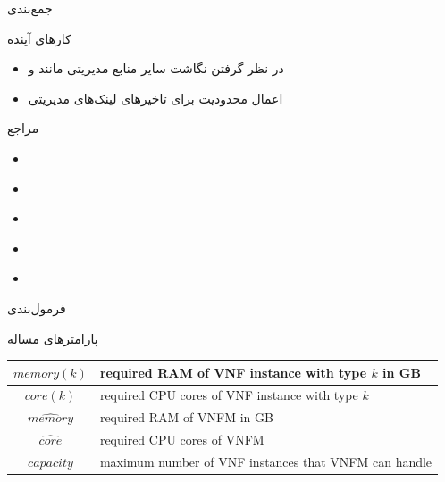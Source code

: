 \documentclass{beamer}
\makeatletter
\newcommand{\RTList}{\raggedleft\rightskip\@totalleftmargin}
\makeatother
\begin{document}
\begin{persian}
\begin{frame}{جمع‌بندی}
\end{frame}
\begin{frame}{کارهای آینده}
    \begin{itemize}\RTList{}
        \item در نظر گرفتن نگاشت سایر منابع مدیریتی مانند  و 
        \item اعمال محدودیت برای تاخیرهای لینک‌های مدیریتی
    \end{itemize}
\end{frame}
\begin{frame}[shrink=25]{مراجع}
    \begin{latin}
    \begin{itemize}
        \item \cite{Bari2015} 
        \item \cite{Eramo2016} 
        \item \cite{Ghaznavi2017} 
        \item \cite{AbuLebdeh2017} 
        \item \cite{Huang2017} 
    \end{itemize}
    \end{latin}
\end{frame}
\begin{frame}{فرمول‌بندی}
    \par پارامترهای مساله
    \begin{center}\begin{latin}\begin{tabular}{|c|p{5cm}|}
        \hline
        \(memory(k)\) & required RAM of VNF instance with type \(k\) in GB \\
        \hline
        \(core(k)\) & required CPU cores of VNF instance with type \(k\) \\
        \hline
        \(\hat{memory}\) & required RAM of VNFM in GB \\
        \hline
        \(\hat{core}\) & required CPU cores of VNFM \\
        \hline
        \(capacity\) & maximum number of VNF instances that VNFM can handle \\

\end{tabular}
\end{latin}
\end{center}
\end{frame}
\end{persian}
\end{document}
